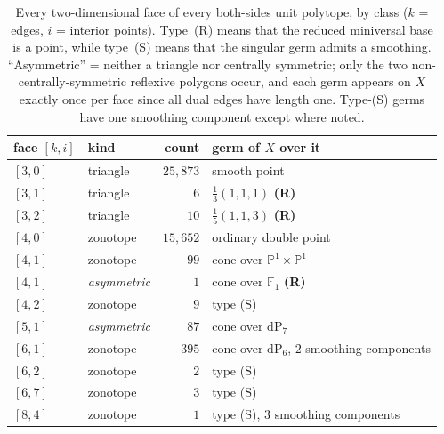 \documentclass[11pt]{amsart}
\theoremstyle{definition}
\theoremstyle{remark}
\newcommand{\PP}{\mathbb{P}}
\newcommand{\FF}{\mathbb{F}}
\begin{document}
\begin{table}[ht]
\begin{center}
\begin{tabular}{llrl}
\toprule
face $[k,i]$ & kind & count & germ of $X$ over it \\
\midrule
$[3,0]$ & triangle & $25{,}873$ & smooth point \\
$[3,1]$ & triangle & $6$ & $\frac13(1,1,1)$ \textbf{(R)} \\
$[3,2]$ & triangle & $10$ & $\frac15(1,1,3)$ \textbf{(R)} \\
$[4,0]$ & zonotope & $15{,}652$ & ordinary double point \\
$[4,1]$ & zonotope & $99$ & cone over $\PP^1{\times}\PP^1$ \\
$[4,1]$ & \emph{asymmetric} & $1$ & cone over $\FF_1$ \textbf{(R)} \\
$[4,2]$ & zonotope & $9$ & type (S) \\
$[5,1]$ & \emph{asymmetric} & $87$ & cone over $\mathrm{dP}_7$ \\
$[6,1]$ & zonotope & $395$ & cone over $\mathrm{dP}_6$, $2$ smoothing components \\
$[6,2]$ & zonotope & $2$ & type (S) \\
$[6,7]$ & zonotope & $3$ & type (S) \\
$[8,4]$ & zonotope & $1$ & type (S), $3$ smoothing components \\
\bottomrule
\end{tabular}
\end{center}
\medskip
\caption{Every two-dimensional face of every both-sides unit polytope, by
class ($k$ = edges, $i$ = interior
points).  Type~\textup{(R)} means that the reduced miniversal base is a
point, while type~\textup{(S)} means that the singular germ admits a
smoothing.  ``Asymmetric'' = neither a
triangle nor centrally symmetric; only the two non-centrally-symmetric
reflexive polygons occur, and each germ appears on $X$ exactly once per
face since all dual edges have length one.  Type-\textup{(S)} germs have
one smoothing component except where noted.}\label{tab:occ}
\end{table}
\end{document}
